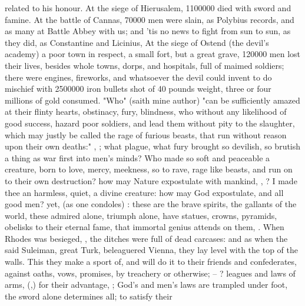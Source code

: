 related to his honour. At the siege of Hierusalem,
1\thinspace{}100\thinspace{}000 died with sword and famine. At the battle of
Cannas, 70\thinspace{}000 men were slain, as Polybius
records, and as many at Battle Abbey with us; and 'tis no news to fight from
sun to sun, as they did, as Constantine and Licinius, \etc{} At the siege of
Ostend (the devil's academy) a poor town in respect, a small fort, but a great
grave, 120\thinspace{}000 men lost their lives, besides whole towns, dorps, and
hospitals, full of maimed soldiers; there were engines, fireworks, and
whatsoever the devil could invent to do mischief with
2\thinspace{}500\thinspace{}000 iron bullets shot of 40 pounds weight, three or
four millions of gold consumed. "Who" (saith mine author)
"can be sufficiently amazed at their flinty hearts, obstinacy, fury, blindness,
who without any likelihood of good success, hazard poor soldiers, and lead them
without pity to the slaughter, which may justly be called the rage of furious
beasts, that run without reason upon their own deaths:"
, \etc{};
what plague, what fury brought so devilish, so brutish a thing as war first
into men's minds? Who made so soft and peaceable a creature, born to love,
mercy, meekness, so to rave, rage like beasts, and run on to their own
destruction? how may Nature expostulate with mankind, , \etc{}? I made thee an harmless, quiet, a divine creature: how may God
expostulate, and all good men? yet,  (as
one condoles) : these are the brave spirits, the gallants of the world, these admired
alone, triumph alone, have statues, crowns, pyramids, obelisks to their eternal
fame, that immortal genius attends on them, . When Rhodes
was besieged, ,
the ditches were full of dead carcases: and as when the said Suleiman, great
Turk, beleaguered Vienna, they lay level with the top of the walls. This they
make a sport of, and will do it to their friends and confederates, against
oaths, vows, promises, by treachery or otherwise; --
? leagues and laws of arms,
(,) for their advantage,
; God's and men's
laws are trampled under foot, the sword alone determines all; to satisfy their

